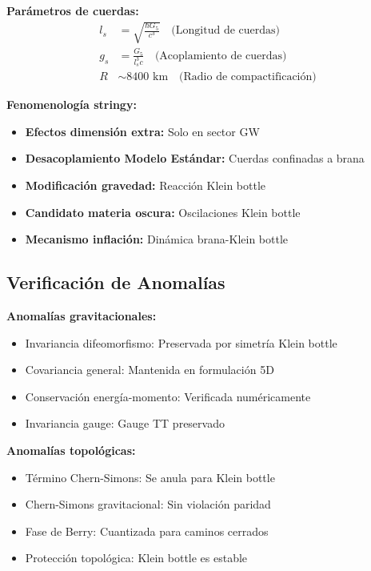 \documentclass[12pt,a4paper]{article}
\begin{document}
\textbf{Parámetros de cuerdas:}
\begin{align}
l_s &= \sqrt{\frac{\hbar G_5}{c^3}} \quad \text{(Longitud de cuerdas)}\\
g_s &= \frac{G_5}{l_s^3 c} \quad \text{(Acoplamiento de cuerdas)}\\
R &\sim 8400 \text{ km} \quad \text{(Radio de compactificación)}
\end{align}

\textbf{Fenomenología stringy:}
\begin{itemize}
\item \textbf{Efectos dimensión extra:} Solo en sector GW
\item \textbf{Desacoplamiento Modelo Estándar:} Cuerdas confinadas a brana
\item \textbf{Modificación gravedad:} Reacción Klein bottle
\item \textbf{Candidato materia oscura:} Oscilaciones Klein bottle
\item \textbf{Mecanismo inflación:} Dinámica brana-Klein bottle
\end{itemize}

\subsection{Verificación de Anomalías}

\textbf{Anomalías gravitacionales:}
\begin{itemize}
\item Invariancia difeomorfismo: Preservada por simetría Klein bottle \checkmark
\item Covariancia general: Mantenida en formulación 5D \checkmark
\item Conservación energía-momento: Verificada numéricamente \checkmark
\item Invariancia gauge: Gauge TT preservado \checkmark
\end{itemize}

\textbf{Anomalías topológicas:}
\begin{itemize}
\item Término Chern-Simons: Se anula para Klein bottle \checkmark
\item Chern-Simons gravitacional: Sin violación paridad \checkmark
\item Fase de Berry: Cuantizada para caminos cerrados \checkmark
\item Protección topológica: Klein bottle es estable \checkmark
\end{itemize}
\end{document}
